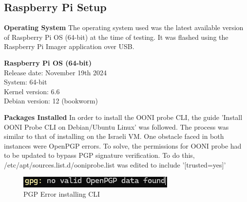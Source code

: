 \subsection{Raspberry Pi Setup}
\textbf{Operating System}
The operating system used was the latest available version of Raspberry Pi OS (64-bit) at the time of testing. It was flashed using the Raspberry Pi Imager application over USB. 

\begin{flushleft}
\hspace{1em}\textbf{Raspberry Pi OS (64-bit)}\\[0.5em]
\hspace{1em}Release date: November 19th 2024\\[0.5em]
\hspace{1em}System: 64-bit\\[0.5em]
\hspace{1em}Kernel version: 6.6\\[0.5em]
\hspace{1em}Debian version: 12 (bookworm)
\end{flushleft}


\textbf{Packages Installed}
In order to install the OONI probe CLI, the guide 'Install OONI Probe CLI on Debian/Ubuntu Linux' \cite{ooni-cli-install} was followed. The process was similar to that of installing on the Israeli VM. One obstacle faced in both instances were OpenPGP errors. To solve, the permissions for OONI probe had to be updated to bypass PGP signature verification. To do this, /etc/apt/sources.list.d/ooniprobe.list was edited to include '[trusted=yes]'

\begin{figure} [H]
    \centering
    \includegraphics[width=0.75\linewidth]{PGPERROR.png}
    \caption{PGP Error installing CLI}
    \label{fig:enter-label}
\end{figure}


